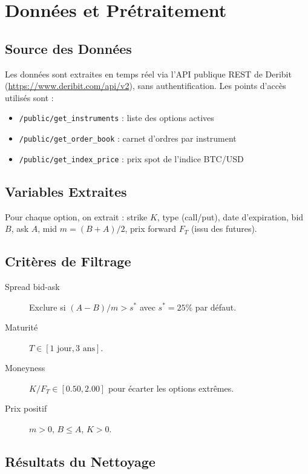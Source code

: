 \section{Données et Prétraitement}
\label{sec:donnees}

\subsection{Source des Données}

Les données sont extraites en temps réel via l'API publique REST de Deribit
(\url{https://www.deribit.com/api/v2}), sans authentification.
Les points d'accès utilisés sont :
\begin{itemize}
  \item \texttt{/public/get\_instruments} : liste des options actives
  \item \texttt{/public/get\_order\_book} : carnet d'ordres par instrument
  \item \texttt{/public/get\_index\_price} : prix spot de l'indice BTC/USD
\end{itemize}

\subsection{Variables Extraites}

Pour chaque option, on extrait : strike $K$, type (call/put), date d'expiration,
bid $B$, ask $A$, mid $m = (B+A)/2$, prix forward $F_T$ (issu des futures).

\subsection{Critères de Filtrage}

\begin{description}
  \item[Spread bid-ask] Exclure si $(A-B)/m > s^*$ avec $s^* = 25\%$ par défaut.
  \item[Maturité] $T \in [1\text{ jour}, 3\text{ ans}]$.
  \item[Moneyness] $K/F_T \in [0.50, 2.00]$ pour écarter les options extrêmes.
  \item[Prix positif] $m > 0$, $B \leq A$, $K > 0$.
\end{description}

\subsection{Résultats du Nettoyage}

